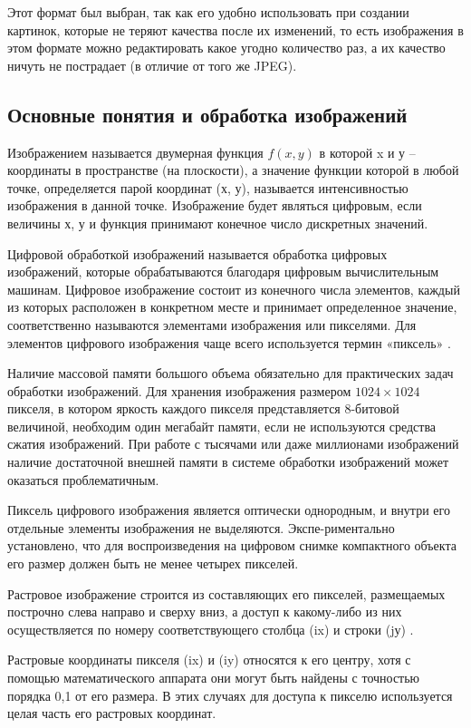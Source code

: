 Этот формат был выбран, так как его удобно использовать при создании картинок, которые не теряют качества после их изменений, то есть изображения в этом формате можно редактировать какое угодно количество раз, а их качество ничуть не пострадает (в отличие от того же JPEG).

\subsection{Основные понятия и обработка изображений}

Изображением называется двумерная функция $f(x,y)$ в которой x и у -- координаты в пространстве (на плоскости), а значение функции которой в любой точке, определяется парой координат (х, у), называется интенсивностью изображения в данной точке. Изображение будет являться цифровым, если величины х, у и функция принимают конечное число дискретных значений.

Цифровой обработкой изображений называется обработка цифровых изображений, которые обрабатываются благодаря цифровым вычислительным машинам. Цифровое изображение состоит из конечного числа элементов, каждый из которых расположен в конкретном месте и принимает определенное значение, соответственно называются элементами изображения или пикселями. Для элементов цифрового изображения чаще всего используется термин «пиксель» \cite{imgProc1}. 

Наличие массовой памяти большого объема обязательно для практических задач обработки изображений. Для хранения изображения размером $1024\times1024$ пикселя, в котором яркость каждого пикселя представляется 8-битовой величиной, необходим один мегабайт памяти, если не используются средства сжатия изображений. При работе с тысячами или даже миллионами изображений наличие достаточной внешней памяти в системе обработки изображений может оказаться проблематичным.

Пиксель цифрового изображения является оптически однородным, и внутри его отдельные элементы изображения не выделяются. Экспе-риментально установлено, что для воспроизведения на цифровом снимке компактного объекта его размер должен быть не менее четырех пикселей.

Растровое изображение строится из составляющих его пикселей, размещаемых построчно слева направо и сверху вниз, а доступ к какому-либо из них осуществляется по номеру соответствующего столбца (ix) и строки (jу) \cite{imgProc2}.

Растровые координаты пикселя (ix) и (iy) относятся к его центру, хотя с помощью математического аппарата они могут быть найдены с точностью порядка 0,1 от его размера. В этих случаях для доступа к пикселю используется целая часть его растровых координат.

